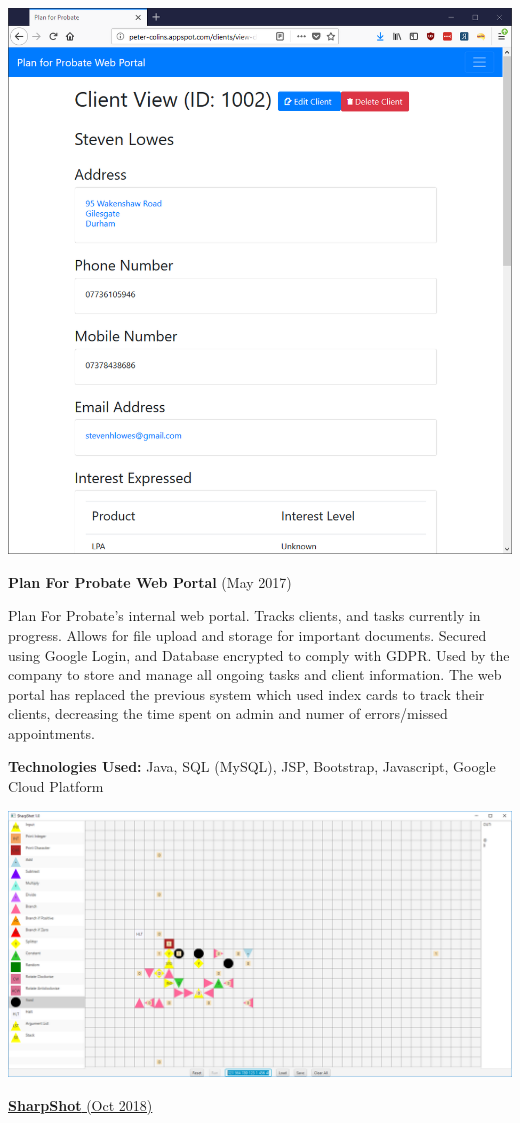 \documentclass[hidelinks, 12pt, a4paper]{article}
\begin{document}
	\hspace{0.02\textwidth}
	\begin{minipage}{0.40\textwidth}		
		\begin{center}
			\includegraphics[width=0.9\linewidth]{planforprobate.png}
		\end{center}
		\textbf{Plan For Probate Web Portal} (May 2017)
		
		Plan For Probate's internal web portal. Tracks clients, and tasks currently in progress. Allows for file upload and storage for important documents. Secured using Google Login, and Database encrypted to comply with GDPR. Used by the company to store and manage all ongoing tasks and client information. The web portal has replaced the previous system which used index cards to track their clients, decreasing the time spent on admin and numer of errors/missed appointments.
		
		\textbf{Technologies Used:} Java, SQL (MySQL), JSP, Bootstrap, Javascript, Google Cloud Platform
		
		\begin{center}
			\href{https://github.com/motherlymuppet/sharpshot}{\includegraphics[width=0.9\linewidth]{sharpshot.png}}
		\end{center}
		\vspace{-12pt}
		\href{https://github.com/motherlymuppet/sharpshot}{\textbf{SharpShot} (Oct 2018)}
		

\end{minipage}
\end{document}

